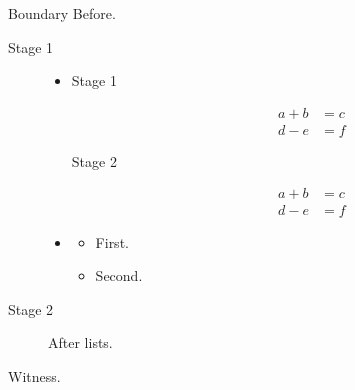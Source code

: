 \documentclass[11pt,aspectratio=169]{beamer}
\begin{document}
\begin{frame}[t]{Boundary}
Before.\par
\begin{description}
\item[Stage 1] \begin{itemize}
\item<1-> \begin{description}
\item[Stage 1] \[\begin{aligned}a+b&=c\\ d-e&=f\end{aligned}\]
\item[Stage 2] \[\begin{aligned}a+b&=c\\ d-e&=f\end{aligned}\]
\end{description}
\item<2-> \begin{itemize}
\item<1-> First.
\item<2-> Second.
\end{itemize}
\end{itemize}
\item[Stage 2] After lists.
\end{description}
Witness.\par
\end{frame}
\end{document}
